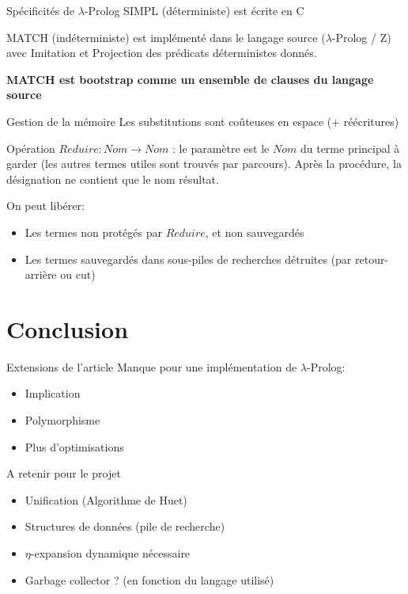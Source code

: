 \documentclass[aspectratio=169]{beamer}
\begin{document}
\begin{frame}{Spécificités de $\lambda$-Prolog}
  SIMPL (déterministe) est écrite en C

  MATCH (indéterministe) est implémenté dans le langage source ($\lambda$-Prolog / Z) avec Imitation et Projection des prédicats déterministes donnés.

  \textbf{MATCH est bootstrap comme un ensemble de clauses du langage source}
\end{frame}

\begin{frame}{Gestion de la mémoire}
  Les substitutions sont coûteuses en espace (+ réécritures)

  Opération $Reduire : Nom \rightarrow Nom$ : le paramètre est le $Nom$ du terme principal à garder (les autres termes utiles sont trouvés par parcours). Après la procédure, la désignation ne contient que le nom résultat.

  On peut libérer:
  \begin{itemize}
    \item Les termes non protégés par $Reduire$, et non sauvegardés
    \item Les termes sauvegardés dans sous-piles de recherches détruites (par retour-arrière ou cut)
  \end{itemize}
\end{frame}

\section{Conclusion}

\begin{frame}{Extensions de l'article}
  Manque pour une implémentation de $\lambda$-Prolog:
  \begin{itemize}
    \item Implication
    \item Polymorphisme
    \item Plus d'optimisations
  \end{itemize}
\end{frame}

\begin{frame}{A retenir pour le projet}
  \begin{itemize}
    \item Unification (Algorithme de Huet)
    \item Structures de données (pile de recherche)
    \item $\eta$-expansion dynamique nécessaire
    \item Garbage collector ? (en fonction du langage utilisé)
  \end{itemize}
\end{frame}
\end{document}
